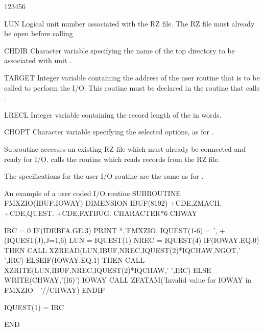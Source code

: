 \begin{DLtt}{123456}
\item[LUN]Logical unit number associated with the RZ file.
The RZ file must already be open before calling 
\item[CHDIR]Character variable specifying the name of the top directory to be
associated with unit .
\item[TARGET]Integer variable containing the address of the user
routine that is to be called to perform the I/O.
This routine must be declared  in the routine
that calls .
\item[LRECL]Integer variable containing the record length of the
 in words.
\item[CHOPT]Character variable specifying the selected options, as for
.
\end{DLtt}

Subroutine  accesses an existing RZ file which must
already be connected and ready for I/O.  calls
the routine  which reads records from the RZ file.

The specifications for the user I/O routine are the same as for
.

\begin{XMPt}{An example of a user coded I/O routine}
      SUBROUTINE FMXZIO(IBUF,IOWAY)
      DIMENSION IBUF(8192)
+CDE,ZMACH.
+CDE,QUEST.
+CDE,FATBUG.
      CHARACTER*6  CHWAY

      IRC  = 0
      IF(IDEBFA.GE.3) PRINT *,'FMXZIO. IQUEST(1-6) = ',
     +   (IQUEST(J),J=1,6)
      LUN  = IQUEST(1)
      NREC = IQUEST(4)
      IF(IOWAY.EQ.0) THEN
         CALL XZREAD(LUN,IBUF,NREC,IQUEST(2)*IQCHAW,NGOT,' ',IRC)
      ELSEIF(IOWAY.EQ.1) THEN
         CALL XZRITE(LUN,IBUF,NREC,IQUEST(2)*IQCHAW,' ',IRC)
      ELSE
         WRITE(CHWAY,'(I6)') IOWAY
         CALL ZFATAM('Invalid value for IOWAY in FMXZIO - '//CHWAY)
      ENDIF

      IQUEST(1) = IRC

      END
\end{XMPt}



